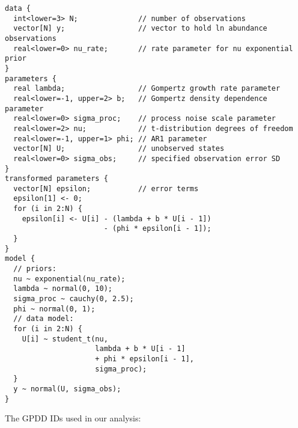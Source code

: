 \begin{spacing}{1.15}
\begin{footnotesize}
\begin{verbatim}
data {
  int<lower=3> N;              // number of observations
  vector[N] y;                 // vector to hold ln abundance observations
  real<lower=0> nu_rate;       // rate parameter for nu exponential prior
}
parameters {
  real lambda;                 // Gompertz growth rate parameter
  real<lower=-1, upper=2> b;   // Gompertz density dependence parameter
  real<lower=0> sigma_proc;    // process noise scale parameter
  real<lower=2> nu;            // t-distribution degrees of freedom
  real<lower=-1, upper=1> phi; // AR1 parameter
  vector[N] U;                 // unobserved states
  real<lower=0> sigma_obs;     // specified observation error SD
}
transformed parameters {
  vector[N] epsilon;           // error terms
  epsilon[1] <- 0;
  for (i in 2:N) {
    epsilon[i] <- U[i] - (lambda + b * U[i - 1])
                       - (phi * epsilon[i - 1]);
  }
}
model {
  // priors:
  nu ~ exponential(nu_rate);
  lambda ~ normal(0, 10);
  sigma_proc ~ cauchy(0, 2.5);
  phi ~ normal(0, 1);
  // data model:
  for (i in 2:N) {
    U[i] ~ student_t(nu,
                     lambda + b * U[i - 1]
                     + phi * epsilon[i - 1],
                     sigma_proc);
  }
  y ~ normal(U, sigma_obs);
}
\end{verbatim}
\end{footnotesize}

\clearpage

\noindent
The GPDD IDs used in our analysis:

\begin{footnotesize}
\noindent
{\tt

}
\end{footnotesize}
\end{spacing}
